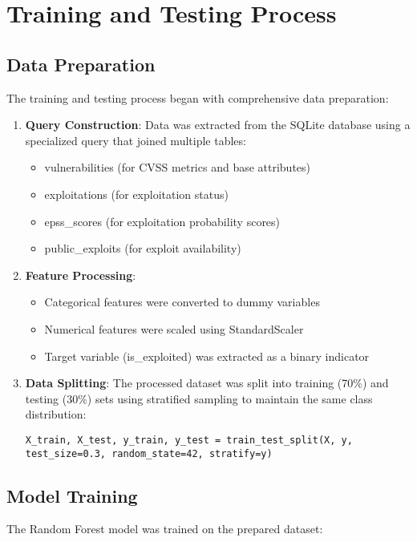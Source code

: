\documentclass[runningheads]{llncs}
\begin{document}
\section{Training and Testing Process}
\label{sec:training_testing}

\subsection{Data Preparation}
The training and testing process began with comprehensive data preparation:

\begin{enumerate}
    \item \textbf{Query Construction}: Data was extracted from the SQLite database using a specialized query that joined multiple tables:
    \begin{itemize}
        \item vulnerabilities (for CVSS metrics and base attributes)
        \item exploitations (for exploitation status)
        \item epss\_scores (for exploitation probability scores)
        \item public\_exploits (for exploit availability)
    \end{itemize}
    
    \item \textbf{Feature Processing}:
    \begin{itemize}
        \item Categorical features were converted to dummy variables
        \item Numerical features were scaled using StandardScaler
        \item Target variable (is\_exploited) was extracted as a binary indicator
    \end{itemize}
    
    \item \textbf{Data Splitting}: The processed dataset was split into training (70\%) and testing (30\%) sets using stratified sampling to maintain the same class distribution:
    
    \texttt{X\_train, X\_test, y\_train, y\_test = train\_test\_split(X, y, test\_size=0.3, random\_state=42, stratify=y)}
\end{enumerate}

\subsection{Model Training}
The Random Forest model was trained on the prepared dataset:
\end{document}

